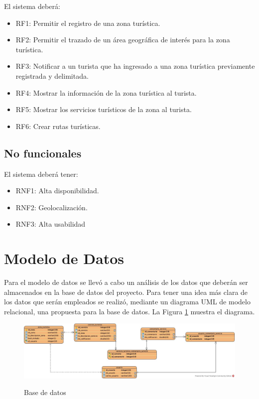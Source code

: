 El sistema deberá:

\begin{itemize}
	\item RF1: Permitir el registro de una zona turística.
	\item RF2: Permitir el trazado de un área geográfica de interés para la zona turística.
	\item RF3: Notificar a un turista que ha ingresado a una zona turística previamente registrada y delimitada.
	\item RF4: Mostrar la información de la zona turística al turista.
	\item RF5: Mostrar los servicios turísticos de la zona al turista.
	\item RF6: Crear rutas turísticas.
\end{itemize}

\hypertarget{cv:noFuncionales}{\subsection{No funcionales}}

El sistema deberá tener: 

\begin{itemize}
	\item RNF1: Alta disponibilidad.
	\item RNF2: Geolocalización.
	\item RNF3: Alta usabilidad
\end{itemize}



\section{Modelo de Datos}
Para el modelo de datos se llevó a cabo un análisis de los datos que deberán ser almacenados en la base de datos del proyecto. Para tener una idea más clara de los datos que serán empleados se realizó, mediante un diagrama UML de modelo relacional, una propuesta para la base de datos. La Figura \ref{fig:base_datos_v1} muestra el diagrama.

\hypertarget{fig:base_datos_v1}{
	\begin{figure}[htbp]
		\begin{center}
			\hypertarget{fig:base_datos_v1}{
				\includegraphics[angle=90, scale=.4]{casosDeUso/images/base_datos_v1.jpg}
				\caption{Base de datos}
			}
			\label{fig:base_datos_v1}
		\end{center}
	\end{figure}
}

